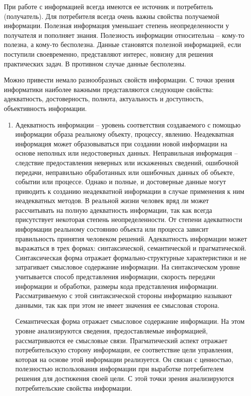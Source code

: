 \documentclass[a4paper]{article}
\begin{document}
 При работе с информацией всегда имеются ее источник и потребитель (получатель). Для потребителя всегда очень важны свойства получаемой информации. Полезная информация уменьшает степень неопределенности у получателя и пополняет знания. Полезность информации относительна – кому-то полезна, а кому-то бесполезна. Данные становятся полезной информацией, если поступили своевременно, представляют интерес, новизну для решения практических задач. В противном случае данные бесполезны.

Можно привести немало разнообразных свойств информации. С точки зрения информатики наиболее важными представляются следующие свойства: адекватность, достоверность, полнота, актуальность и доступность, объективность информации.

\begin{enumerate}
\item Адекватность информации – уровень соответствия создаваемого с помощью информации образа реальному объекту, процессу, явлению. Неадекватная информация может образовываться при создании новой информации на основе неполных или недостоверных данных. Неправильная информация – следствие предоставления неверных или искаженных сведений, ошибочной передачи, неправильно обработанных или ошибочных данных об объекте, событии или процессе. Однако и полные, и достоверные данные могут приводить к созданию неадекватной информации в случае применения к ним неадекватных методов. В реальной жизни человек вряд ли может рассчитывать на полную адекватность информации, так как всегда присутствует некоторая степень неопределенности. От степени адекватности информации реальному состоянию объекта или процесса зависит правильность принятия человеком решений. Адекватность информации может выражаться в трех формах: синтаксической, семантической и прагматической. Синтаксическая форма отражает формально-структурные характеристики и не затрагивает смысловое содержание информации. На синтаксическом уровне учитывается способ представления информации, скорость передачи информации и обработки, размеры кода представления информации. Рассматриваемую с этой синтаксической стороны информацию называют данными, так как при этом не имеет значения ее смысловая сторона.

Семантическая форма отражает смысловое содержание информации. На этом уровне анализируются сведения, предоставляемые информацией, рассматриваются ее смысловые связи. Прагматический аспект отражает потребительскую сторону информации, ее соответствие цели управления, которая на основе этой информации реализуется. Он связан с ценностью, полезностью использования информации при выработке потребителем решения для достижения своей цели. С этой точки зрения анализируются потребительские свойства информации.


\end{enumerate}
\end{document}
